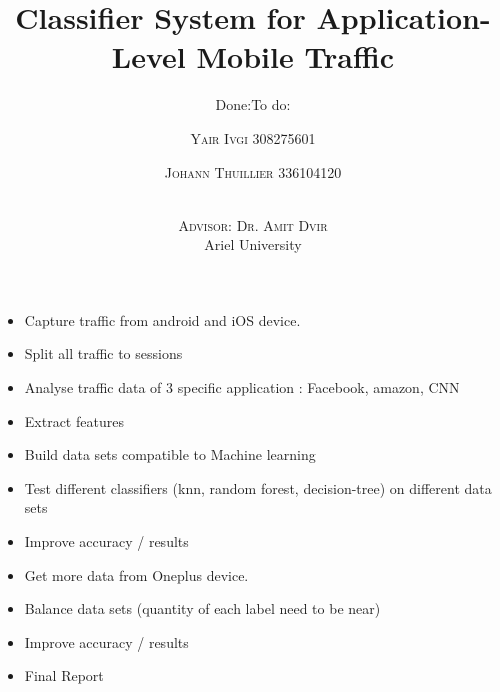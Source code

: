 \documentclass[twoside]{article}
\title{Classifier System for Application-Level Mobile Traffic} %
\author{%
\textsc{Yair Ivgi} %
\normalsize 308275601  %
\and
\textsc{Johann Thuillier} %
\normalsize 336104120 %
\and
\\ \textsc{Advisor: Dr. Amit Dvir}\\   %
\normalsize  Ariel University  %
}
\date{}
\begin{document}
\maketitle
\subtitle{\huge Done:}

\large \begin{itemize}
    \item Capture traffic from android and iOS device.
    \item Split all traffic to sessions
    \item Analyse traffic data of 3 specific application : Facebook, amazon, CNN
    \item Extract features
    \item Build data sets compatible to Machine learning 
    \item Test different classifiers (knn, random forest, decision-tree) on different data sets
    \item Improve accuracy / results
\end{itemize}

\vspace{1.5\baselineskip}

\subtitle{\huge To do:}
\begin{itemize}
    \item Get more data from Oneplus device.
    \item Balance data sets (quantity of each label need to be near)
    \item Improve accuracy / results
    \item Final Report


\end{itemize}
\end{document}
